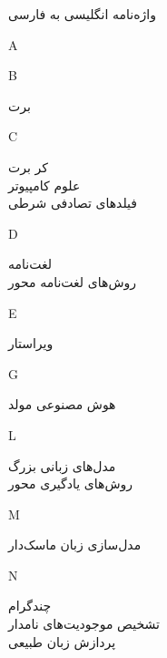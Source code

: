 

\begin{center}
\vspace{1.5cm}
\Huge{واژه‌نامه انگلیسی به فارسی}
\vspace{1.5cm}
\end{center}
\begin{center}
A
\end{center}
\begin{center}
B
\end{center}
	 \dotfill 	برت \\ 
\begin{center}
C
\end{center}
	 \dotfill 	کر برت \\ 
	 \dotfill 	علوم کامپیوتر \\ 
	 \dotfill 	فیلدهای تصادفی شرطی \\ 
\begin{center}
D
\end{center}
	 \dotfill 	لغت‌نامه \\ 
	 \dotfill 	روش‌های لغت‌نامه محور \\ 
\begin{center}
E
\end{center}
	 \dotfill 	ویراستار \\ 
\begin{center}
G
\end{center}
	 \dotfill 	هوش مصنوعی مولد \\ 
\begin{center}
L
\end{center}
	 \dotfill 	مدل‌های زبانی بزرگ \\ 
	 \dotfill 	روش‌های یادگیری محور \\ 
\begin{center}
M
\end{center}
	 \dotfill 	مدل‌سازی زبان ماسک‌دار \\ 
\begin{center}
N
\end{center}
	 \dotfill 	چندگرام \\ 
	 \dotfill 	تشخیص موجودیت‌های نامدار \\ 
	 \dotfill 	پردازش زبان طبیعی \\ 
